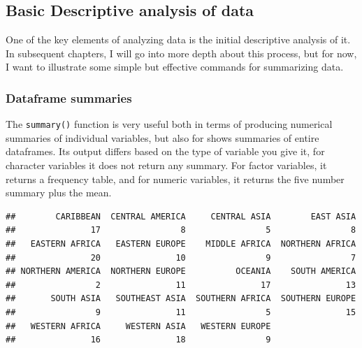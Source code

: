 \documentclass[
]{article}
\newenvironment{Shaded}{\begin{snugshade}}{\end{snugshade}}
\newcommand{\FunctionTok}[1]{\textcolor[rgb]{0.00,0.00,0.00}{#1}}
\newcommand{\NormalTok}[1]{#1}
\newcommand{\SpecialCharTok}[1]{\textcolor[rgb]{0.00,0.00,0.00}{#1}}
\begin{document}
\hypertarget{basic-descriptive-analysis-of-data}{%
\subsection{Basic Descriptive analysis of data}\label{basic-descriptive-analysis-of-data}}

One of the key elements of analyzing data is the initial descriptive
analysis of it. In subsequent chapters, I will go into more depth about
this process, but for now, I want to illustrate some simple but
effective commands for summarizing data.

\hypertarget{dataframe-summaries}{%
\subsubsection{Dataframe summaries}\label{dataframe-summaries}}

The \texttt{summary()} function is very useful both in terms of producing
numerical summaries of individual variables, but also for shows
summaries of entire dataframes. Its output differs based on the type of
variable you give it, for character variables it does not return any
summary. For factor variables, it returns a frequency table, and for
numeric variables, it returns the five number summary plus the mean.

\begin{Shaded}
\end{Shaded}

\begin{verbatim}
##        CARIBBEAN  CENTRAL AMERICA     CENTRAL ASIA        EAST ASIA 
##               17                8                5                8 
##   EASTERN AFRICA   EASTERN EUROPE    MIDDLE AFRICA  NORTHERN AFRICA 
##               20               10                9                7 
## NORTHERN AMERICA  NORTHERN EUROPE          OCEANIA    SOUTH AMERICA 
##                2               11               17               13 
##       SOUTH ASIA   SOUTHEAST ASIA  SOUTHERN AFRICA  SOUTHERN EUROPE 
##                9               11                5               15 
##   WESTERN AFRICA     WESTERN ASIA   WESTERN EUROPE 
##               16               18                9
\end{verbatim}

\begin{Shaded}
\end{Shaded}
\end{document}
